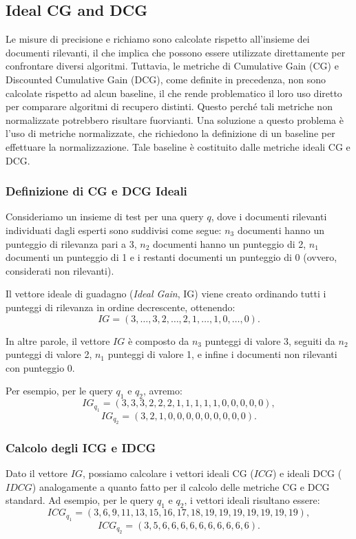 \documentclass{report}
\begin{document}
	\subsection{Ideal CG and DCG}
	Le misure di precisione e richiamo sono calcolate rispetto all'insieme dei documenti rilevanti, il che implica che possono essere utilizzate direttamente per confrontare diversi algoritmi. Tuttavia, le metriche di Cumulative Gain (CG) e Discounted Cumulative Gain (DCG), come definite in precedenza, non sono calcolate rispetto ad alcun baseline, il che rende problematico il loro uso diretto per comparare algoritmi di recupero distinti. Questo perché tali metriche non normalizzate potrebbero risultare fuorvianti. Una soluzione a questo problema è l'uso di metriche normalizzate, che richiedono la definizione di un baseline per effettuare la normalizzazione. Tale baseline è costituito dalle metriche ideali CG e DCG.

	\subsubsection{Definizione di CG e DCG Ideali}
	Consideriamo un insieme di test per una query $q$, dove i documenti rilevanti individuati dagli esperti sono suddivisi come segue: $n_3$ documenti hanno un punteggio di rilevanza pari a 3, $n_2$ documenti hanno un punteggio di 2, $n_1$ documenti un punteggio di 1 e i restanti documenti un punteggio di 0 (ovvero, considerati non rilevanti). 
	
	Il vettore ideale di guadagno (\textit{Ideal Gain}, IG) viene creato ordinando tutti i punteggi di rilevanza in ordine decrescente, ottenendo:
	\[
	IG = (3, \ldots, 3, 2, \ldots, 2, 1, \ldots, 1, 0, \ldots, 0).
	\]
	
	In altre parole, il vettore $IG$ è composto da $n_3$ punteggi di valore 3, seguiti da $n_2$ punteggi di valore 2, $n_1$ punteggi di valore 1, e infine i documenti non rilevanti con punteggio 0.
	
	Per esempio, per le query $q_1$ e $q_2$, avremo:
	\[
	IG_{q_1} = (3, 3, 3, 2, 2, 2, 1, 1, 1, 1, 1, 0, 0, 0, 0, 0),
	\]
	\[
	IG_{q_2} = (3, 2, 1, 0, 0, 0, 0, 0, 0, 0, 0, 0).
	\]
	
	\subsubsection{Calcolo degli ICG e IDCG}
	Dato il vettore $IG$, possiamo calcolare i vettori ideali CG ($ICG$) e ideali DCG ($IDCG$) analogamente a quanto fatto per il calcolo delle metriche CG e DCG standard. Ad esempio, per le query $q_1$ e $q_2$, i vettori ideali risultano essere:
	\[
	ICG_{q_1} = (3, 6, 9, 11, 13, 15, 16, 17, 18, 19, 19, 19, 19, 19, 19, 19),
	\]
	\[
	ICG_{q_2} = (3, 5, 6, 6, 6, 6, 6, 6, 6, 6, 6, 6).
	\]
	
\end{document}

